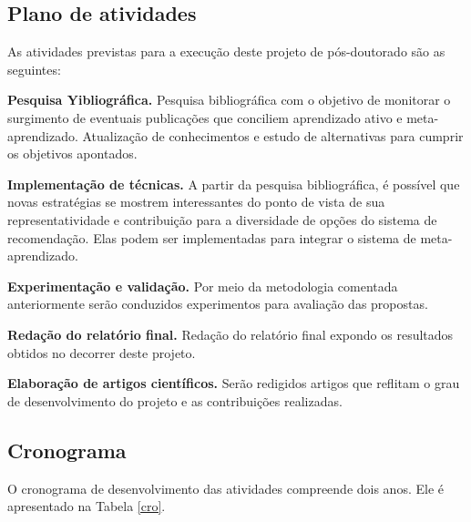 \subsection{Plano de atividades}
As atividades previstas para a execução deste projeto de pós-doutorado são as seguintes:

\begin{compactenum}

\item{\textbf{Pesquisa Yibliográfica.} Pesquisa bibliográfica com o objetivo de
monitorar o surgimento de eventuais publicações que conciliem aprendizado ativo e meta-aprendizado. Atualização de conhecimentos e estudo de alternativas para cumprir os objetivos apontados.}

\item{\textbf{Implementação de técnicas.} A partir da pesquisa bibliográfica, é possível que novas estratégias se mostrem interessantes do ponto de 
vista de sua representatividade e contribuição para a diversidade de opções
do sistema de recomendação. Elas podem ser implementadas para integrar o sistema de meta-aprendizado.}

\item{\textbf{Experimentação e validação.} Por meio da metodologia comentada anteriormente serão conduzidos experimentos para avaliação das propostas.}

\item {\textbf{Redação do relatório final.} Redação do relatório final expondo os resultados obtidos no decorrer deste projeto.}

\item{\textbf{Elaboração de artigos científicos.} Serão redigidos artigos que reflitam o grau de desenvolvimento do projeto e as contribuições realizadas.}
\end{compactenum}

\subsection{Cronograma}\label{ssec:Cronograma}
O cronograma de desenvolvimento das atividades compreende dois anos.
Ele é apresentado na Tabela \ref{cro}.

\newcommand{\y}{\rule{13pt}{5pt}}
\newcommand{\x}{\hspace*{4pt}}
\setlength{\tabcolsep}{0pt}


